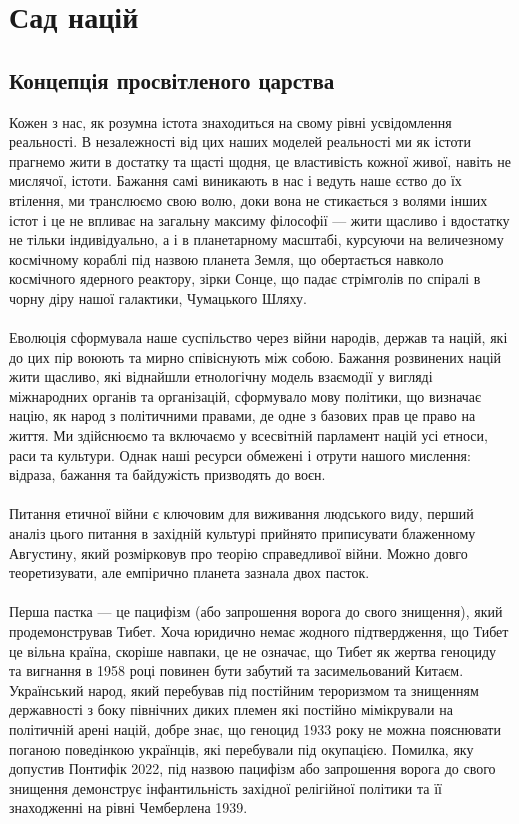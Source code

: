 \section{Сад націй}

\subsection{Концепція просвітленого царства}

\ru Кожен з нас, як розумна істота знаходиться на свому рівні усвідомлення реальності. В незалежності від цих наших моделей реальності ми як істоти прагнемо жити в достатку та щасті щодня, це властивість кожної живої, навіть не мислячої, істоти. Бажання самі виникають в нас і ведуть наше єство до їх втілення, ми транслюємо свою волю, доки вона не стикається з волями інших істот і це не впливає на загальну максиму філософії — жити щасливо і вдостатку не тільки індивідуально, а і в планетарному масштабі, курсуючи на величезному космічному кораблі під назвою планета Земля, що обертається навколо космічного ядерного реактору, зірки Сонце, що падає стрімголів по спіралі в чорну діру нашої галактики, Чумацького Шляху.
\\
\\
Еволюція сформувала наше суспільство через війни народів, держав та націй, які до цих пір воюють та мирно співіснують між собою. Бажання розвинених націй жити щасливо, які віднайшли етнологічну модель взаємодії у вигляді міжнародних органів та організацій, сформувало мову політики, що визначає націю, як народ з політичними правами, де одне з базових прав це право на життя. Ми здійснюємо та включаємо у всесвітній парламент націй усі етноси, раси та культури. Однак наші ресурси обмежені і отрути нашого мислення: відраза, бажання та байдужість призводять до воєн.
\\
\\
Питання етичної війни є ключовим для виживання людського виду, перший аналіз цього питання в західній культурі прийнято приписувати блаженному Августину, який розмірковув про теорію справедливої війни. Можно довго теоретизувати, але емпірично планета зазнала двох пасток.
\\
\\
Перша пастка — це пацифізм (або запрошення ворога до свого знищення), який продемонстрував Тибет. Хоча юридично немає жодного підтвердження, що Тибет це вільна країна, скоріше навпаки, це не означає, що Тибет як жертва геноциду та вигнання в 1958 році повинен бути забутий та засимельований Китаєм. Український народ, який перебував під постійним тероризмом та знищенням державності з боку північних диких племен які постійно мімікрували на політичній арені націй, добре знає, що геноцид 1933 року не можна пояснювати поганою поведінкою українців, які перебували під окупацією. Помилка, яку допустив Понтифік 2022, під назвою пацифізм або запрошення ворога до свого знищення демонструє інфантильність західної релігійної політики та її знаходженні на рівні Чемберлена 1939.
